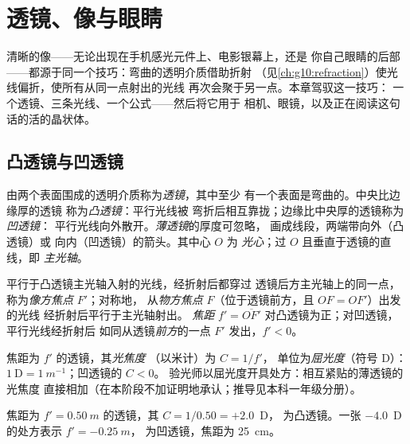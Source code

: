 \chapter{透镜、像与眼睛}\label{ch:g11:lenses-and-eye}

清晰的像——无论出现在手机感光元件上、电影银幕上，还是
你自己眼睛的后部——都源于同一个技巧：弯曲的透明介质借助折射
（见\cref{ch:g10:refraction}）使光线偏折，使所有从同一点射出的光线
再次会聚于另一点。本章驾驭这一技巧：
一个透镜、三条光线、一个公式——然后将它用于
相机、眼镜，以及正在阅读这句话的活的晶状体。

\section{凸透镜与凹透镜}

\begin{definition}[薄透镜]\label{def:g11:lenses-and-eye:lens}
由两个表面围成的透明介质称为\emph{透镜}，其中至少
有一个表面是弯曲的。中央比边缘厚的透镜
称为\emph{凸透镜}：平行光线被
弯折后相互靠拢；边缘比中央厚的透镜称为\emph{凹透镜}：
平行光线向外散开。\emph{薄透镜}的厚度可忽略，
画成线段，两端带向外（凸透镜）或
向内（凹透镜）的箭头。其中心 $O$ 为
\emph{光心}；过 $O$ 且垂直于透镜的直线，即
\emph{主光轴}。
\end{definition}

\begin{definition}[焦点与焦距]\label{def:g11:lenses-and-eye:focal}
平行于凸透镜主光轴入射的光线，经折射后都穿过
透镜后方主光轴上的同一点，称为\emph{像方焦点} $F'$；对称地，
从\emph{物方焦点} $F$（位于透镜前方，且 $OF = OF'$）出发的光线
经折射后平行于主光轴射出。
\emph{焦距} $f' = \overline{OF'}$
对凸透镜为正；对凹透镜，平行光线经折射后
如同从透镜\emph{前方}的一点 $F'$ 发出，$f' < 0$。
\end{definition}

\begin{definition}[光焦度]\label{def:g11:lenses-and-eye:vergence}
焦距为 $f'$ 的透镜，其\emph{光焦度}
（以米计）为 $C = 1/f'$，
单位为\emph{屈光度}（符号 D）：
$1~\text{D} = \qty{1}{m^{-1}}$；凹透镜的 $C < 0$。
验光师以屈光度开具处方：相互紧贴的薄透镜的光焦度
直接相加（在本阶段不加证明地承认；推导见本科一年级分册）。
\end{definition}

\begin{example}[读懂验光处方]\label{ex:g11:lenses-and-eye:vergence}
焦距为 $f' = \qty{0.50}{m}$ 的透镜，其 $C = 1/0.50 = +2.0$~D，
为凸透镜。一张 $-4.0$~D 的处方表示 $f' = \qty{-0.25}{m}$，
为凹透镜，焦距为 \qty{25}{cm}。
\end{example}

